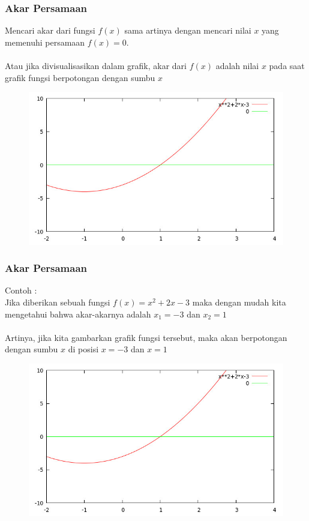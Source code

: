 \documentclass{beamer}
\begin{document}
\begin{frame}
\frametitle{Akar Persamaan}
Mencari akar dari fungsi $f(x)$ sama artinya dengan mencari nilai $x$ yang memenuhi persamaan $f(x)=0$.
\\\ \\Atau jika divisualisasikan dalam grafik, akar dari $f(x)$ adalah nilai $x$ pada saat grafik fungsi berpotongan dengan sumbu $x$
\begin{figure}[htp]
\centering
\includegraphics[scale=0.30]{Fungsi.jpg}
\end{figure}
\end{frame}


\begin{frame}
\frametitle{Akar Persamaan}
Contoh : 
\\Jika diberikan sebuah fungsi $f(x)= x^2+2x-3$ maka dengan mudah kita mengetahui bahwa akar-akarnya adalah $x_1 = -3$ dan $x_2 = 1$
\\\ \\Artinya, jika kita gambarkan grafik fungsi tersebut, maka akan berpotongan dengan sumbu $x$ di posisi $x = -3$ dan $x = 1$
\begin{figure}[htp]
\centering
\includegraphics[scale=0.30]{Fungsi.jpg}
\end{figure}
\end{frame}
\end{document}
